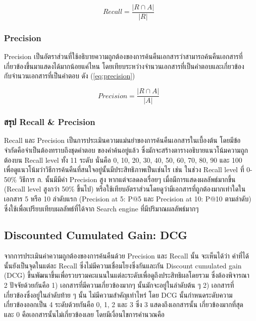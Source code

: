 \documentclass[11pt,a4paper]{article}
\begin{document}
{{{\begin{equation}
    Recall = \frac{|R \cap A|}{|R|}
    \label{eq:recall}
\end{equation}

\subsubsection{Precision}

Precision เป็นอัตราส่วนที่ใช้อธิบายความถูกต้องของการค้นคืนเอกสารว่าสามารถค้นคืนเอกสารที่เกี่ยวข้องขึ้นมาแสดงได้มากน้อยแค่ไหน 
โดยเทียบระหว่างจำนวนเอกสารที่เป็นคำตอบและเกี่ยวข้อง กับจำนวนเอกสารที่เป็นคำตอบ ดัง (\ref{eq:precision})

\begin{equation}
    Precision = \frac{|R \cap A|}{|A|}
    \label{eq:precision}
\end{equation}

\subsubsection{สรุป Recall \& Precision}

Recall และ Precision เป็นการประเมินความแม่นยำของการค้นคืนเอกสารในเบื้องต้น โดยมีข้อจำกัดคือจำเป็นต้องทราบถึงชุดคำตอบ
ของคำค้นอยู่แล้ว ซึ่งมักจะสร้างตารางอธิบายแนวโน้มความถูกต้องบน Recall level ทั้ง 11 ระดับ นั่นคือ 0, 10, 20, 30, 40, 50,
60, 70, 80, 90 และ 100 เพื่อดูแนวโน้มว่าวิธีการค้นคืนที่สนใจอยู่นั้นมีประสิทธิภาพเป็นเช่นไร เช่น ในช่วง Recall level ที่ 0-50\%
วิธีการ ก. นั้นมีมีค่า Precision สูง หากแต่จะลดลงเรื่อยๆ เมื่อมีการแสดงผลลัพธ์มากขึ้น (Recall level สูงกว่า 50\% ขึ้นไป)
หรือใช้เทียบอัตราส่วนโดยดูว่ามีเอกสารที่ถูกต้องมากเท่าใดในเอกสาร 5 หรือ 10 ลำดับแรก (Precision at 5: P@5 
และ Precision at 10: P@10 ตามลำดับ) ซึ่งใช้เพื่อเปรียบเทียบผลลัพธ์ที่ได้จาก Search engine ที่มีปริมาณผลลัพธ์มากๆ 

\subsection{Discounted Cumulated Gain: DCG}
จากการประเมินค่าความถูกต้องของการค้นคืนด้วย Precision และ Recall นั้น จะเห็นได้ว่า ค่าที่ได้นั้นยังเป็นจุดในแต่ละ Recall 
ซึ่งไม่มีความเชื่อมโยงซึ่งกันและกัน Discount cumulated gain (DCG) ขึ้นพัฒนาขึ้นเพื่อรวบรวมคะแนนในแต่ละระดับเพื่อดูถึงประสิทธิผลโดยรวม
ซึ่งต้องพิจารณา 2 ปัจจัยด้วยกันคือ 1) เอกสารที่มีความเกี่ยวข้องมากๆ นั้นมักจะอยู่ในลำดับต้น ๆ 2) เอกสารที่เกี่ยวข้องซึ่งอยู่ในลำดับท้าย ๆ นั้น
ไม่มีความสำคัญเท่าไหร่ โดย DCG นั้นกำหนดระดับความเกี่ยวข้องออกเป็น 4 ระดับด้วยกันคือ 0, 1, 2 และ 3 ซึ่ง 3 แสดงถึงเอกสารนั้น
เกี่ยวข้องมากที่สุด และ 0 คือเอกสารนั้นไม่เกี่ยวข้องเลย โดยมีเงื่อนไขการคำนวณคือ

}}}
\end{document}

